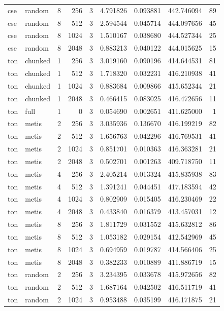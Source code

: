 \begin{tabular}{llrrrrrrr}
cse & random & 8 & 256 & 3 & 4.791826 & 0.093881 & 442.746094 & 89 \\
cse & random & 8 & 512 & 3 & 2.594544 & 0.045714 & 444.097656 & 45 \\
cse & random & 8 & 1024 & 3 & 1.510167 & 0.038680 & 444.527344 & 25 \\
cse & random & 8 & 2048 & 3 & 0.883213 & 0.040122 & 444.015625 & 15 \\
ton & chunked & 1 & 256 & 3 & 3.019160 & 0.090196 & 414.644531 & 81 \\
ton & chunked & 1 & 512 & 3 & 1.718320 & 0.032231 & 416.210938 & 41 \\
ton & chunked & 1 & 1024 & 3 & 0.883684 & 0.009866 & 415.652344 & 21 \\
ton & chunked & 1 & 2048 & 3 & 0.466415 & 0.083025 & 416.472656 & 11 \\
ton & full & 1 & 0 & 3 & 0.054690 & 0.002651 & 411.625000 & 1 \\
ton & metis & 2 & 256 & 3 & 3.035936 & 0.136670 & 416.199219 & 82 \\
ton & metis & 2 & 512 & 3 & 1.656763 & 0.042296 & 416.769531 & 41 \\
ton & metis & 2 & 1024 & 3 & 0.851701 & 0.010363 & 416.363281 & 21 \\
ton & metis & 2 & 2048 & 3 & 0.502701 & 0.001263 & 409.718750 & 11 \\
ton & metis & 4 & 256 & 3 & 2.405214 & 0.013324 & 415.835938 & 83 \\
ton & metis & 4 & 512 & 3 & 1.391241 & 0.044451 & 417.183594 & 42 \\
ton & metis & 4 & 1024 & 3 & 0.802909 & 0.015405 & 416.230469 & 22 \\
ton & metis & 4 & 2048 & 3 & 0.433840 & 0.016379 & 413.457031 & 12 \\
ton & metis & 8 & 256 & 3 & 1.811729 & 0.031552 & 415.632812 & 86 \\
ton & metis & 8 & 512 & 3 & 1.053182 & 0.029154 & 412.542969 & 45 \\
ton & metis & 8 & 1024 & 3 & 0.694959 & 0.019787 & 414.566406 & 25 \\
ton & metis & 8 & 2048 & 3 & 0.382233 & 0.010889 & 411.886719 & 15 \\
ton & random & 2 & 256 & 3 & 3.234395 & 0.033678 & 415.972656 & 82 \\
ton & random & 2 & 512 & 3 & 1.687164 & 0.042502 & 416.511719 & 41 \\
ton & random & 2 & 1024 & 3 & 0.953488 & 0.035199 & 416.171875 & 21 \\

\end{tabular}
